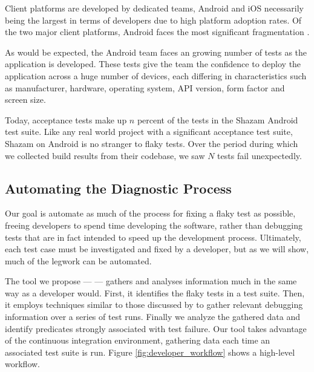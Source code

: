 Client platforms are developed by dedicated teams, Android and iOS necessarily being the largest in terms of developers due to high platform adoption rates. Of the two major client platforms, Android faces the most significant fragmentation \cite{AndroidFragmentationVisualized}.

As would be expected, the Android team faces an growing number of tests as the application is developed.  These tests give the team the confidence to deploy the application across a huge number of devices, each differing in characteristics such as manufacturer, hardware, operating system, API version, form factor and screen size.

Today, acceptance tests make up $n$ percent of the tests in the Shazam Android test suite. Like any real world project with a significant acceptance test suite, Shazam on Android is no stranger to flaky tests. Over the period  during which we collected build results from their codebase, we saw $N$ tests fail unexpectedly.


\subsection{Automating the Diagnostic Process}

Our goal is automate as much of the process for fixing a flaky test as possible, freeing developers to spend time developing the software, rather than debugging tests that are in fact intended to speed up the development process. Ultimately, each test case must be investigated and fixed by a developer, but as we will show, much of the legwork can be automated.

The tool we propose --- \emph{\splatter} --- gathers and analyses information much in the same way as a developer would. First, it identifies the flaky tests in a test suite. Then, it employs techniques similar to those discussed by \citet{ArumugaNainar:2010:ABI:1806799.1806839} to gather relevant debugging information over a series of test runs. Finally we analyze the gathered data and identify predicates strongly associated with test failure. Our tool takes advantage of the continuous integration environment, gathering data each time an associated test suite is run. Figure \ref{fig:developer_workflow} shows a high-level \splatter{} workflow.

